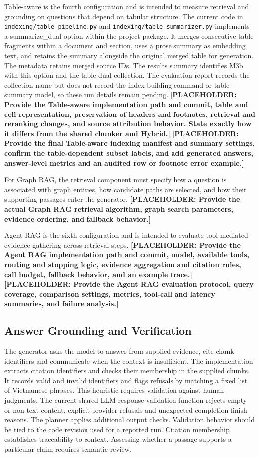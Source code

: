 \documentclass[oneside]{sn-jnl}
\newcommand{\pending}[1]{\textbf{\textcolor{red!65!black}{[PLACEHOLDER: #1]}}}
\newcommand{\artifact}[1]{\nolinkurl{#1}}
\begin{document}
Table-aware is the fourth configuration and is intended to measure retrieval and grounding on questions that depend on tabular structure. The current code in \artifact{indexing/table_pipeline.py} and \artifact{indexing/table_summarizer.py} implements a summarize\_dual option within the project package. It merges consecutive table fragments within a document and section, uses a prose summary as embedding text, and retains the summary alongside the original merged table for generation. The metadata retains merged source IDs. The results summary identifies M3b with this option and the table-dual collection. The evaluation report records the collection name but does not record the index-building command or table-summary model, so these run details remain pending.
\pending{Provide the Table-aware implementation path and commit, table and cell representation, preservation of headers and footnotes, retrieval and reranking changes, and source attribution behavior. State exactly how it differs from the shared chunker and Hybrid.}
\pending{Provide the final Table-aware indexing manifest and summary settings, confirm the table-dependent subset labels, and add generated answers, answer-level metrics and an audited row or footnote error example.}

For Graph RAG, the retrieval component must specify how a question is associated with graph entities, how candidate paths are selected, and how their supporting passages enter the generator.
\pending{Provide the actual Graph RAG retrieval algorithm, graph search parameters, evidence ordering, and fallback behavior.}

Agent RAG is the sixth configuration and is intended to evaluate tool-mediated evidence gathering across retrieval steps.
\pending{Provide the Agent RAG implementation path and commit, model, available tools, routing and stopping logic, evidence aggregation and citation rules, call budget, fallback behavior, and an example trace.}
\pending{Provide the Agent RAG evaluation protocol, query coverage, comparison settings, metrics, tool-call and latency summaries, and failure analysis.}

\subsection{Answer Grounding and Verification}
The generator asks the model to answer from supplied evidence, cite chunk identifiers and communicate when the context is insufficient. The implementation extracts citation identifiers and checks their membership in the supplied chunks. It records valid and invalid identifiers and flags refusals by matching a fixed list of Vietnamese phrases. This heuristic requires validation against human judgments. The current shared LLM response-validation function rejects empty or non-text content, explicit provider refusals and unexpected completion finish reasons. The planner applies additional output checks. Validation behavior should be tied to the code revision used for a reported run. Citation membership establishes traceability to context. Assessing whether a passage supports a particular claim requires semantic review.
\end{document}
